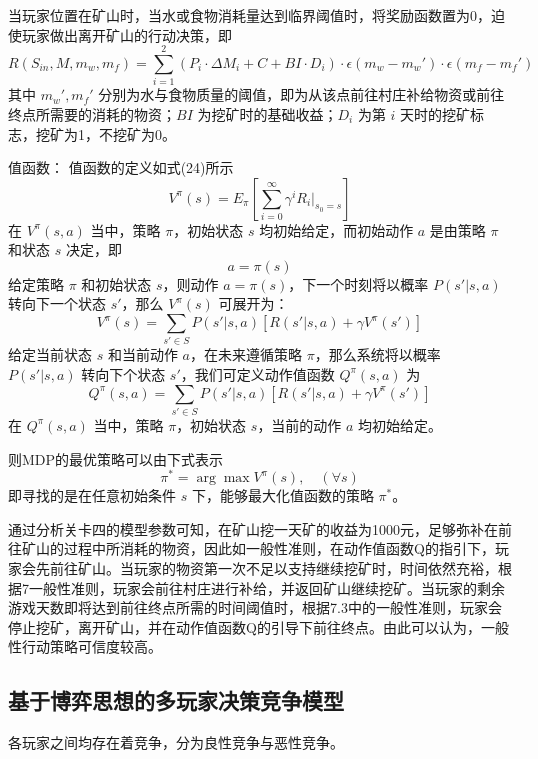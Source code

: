 \documentclass[UTF8]{article}
\begin{document}
当玩家位置在矿山时，当水或食物消耗量达到临界阈值时，将奖励函数置为0，迫使玩家做出离开矿山的行动决策，即
\[
R(S_{in}, M, m_w, m_f) = \sum_{i=1}^{2}(P_i \cdot \Delta M_i + C + BI \cdot D_i) \cdot \epsilon(m_w - m_w') \cdot \epsilon(m_f - m_f') 
\]
其中 \(m_w', m_f'\) 分别为水与食物质量的阈值，即为从该点前往村庄补给物资或前往终点所需要的消耗的物资；\(BI\) 为挖矿时的基础收益；\(D_i\) 为第 \(i\) 天时的挖矿标志，挖矿为1，不挖矿为0。

值函数：
值函数的定义如式(24)所示
\[
V^\pi(s) = E_\pi\left[\sum_{i=0}^{\infty} \gamma^i R_i \big|_{s_0 = s}\right] 
\]
在 \(V^\pi(s,a)\) 当中，策略 \(\pi\)，初始状态 \(s\) 均初始给定，而初始动作 \(a\) 是由策略 \(\pi\) 和状态 \(s\) 决定，即
\[
a = \pi(s) 
\]
给定策略 \(\pi\) 和初始状态 \(s\)，则动作 \(a = \pi(s)\)，下一个时刻将以概率 \(P(s'|s,a)\) 转向下一个状态 \(s'\)，那么 \(V^\pi(s)\) 可展开为：
\[
V^\pi(s) = \sum_{s' \in S} P(s'|s,a)[R(s'|s,a) + \gamma V^\pi(s')] 
\]
给定当前状态 \(s\) 和当前动作 \(a\)，在未来遵循策略 \(\pi\)，那么系统将以概率 \(P(s'|s,a)\) 转向下个状态 \(s'\)，我们可定义动作值函数 \(Q^\pi(s,a)\) 为
\[
Q^\pi(s,a) = \sum_{s' \in S} P(s'|s,a)[R(s'|s,a) + \gamma V^\pi(s')] 
\]
在 \(Q^\pi(s,a)\) 当中，策略 \(\pi\)，初始状态 \(s\)，当前的动作 \(a\) 均初始给定。

则MDP的最优策略可以由下式表示
\[
\pi^* = \arg \max V^\pi(s), \quad (\forall s) 
\]
即寻找的是在任意初始条件 \(s\) 下，能够最大化值函数的策略 \(\pi^*\)。

通过分析关卡四的模型参数可知，在矿山挖一天矿的收益为1000元，足够弥补在前往矿山的过程中所消耗的物资，因此如一般性准则，在动作值函数Q的指引下，玩家会先前往矿山。当玩家的物资第一次不足以支持继续挖矿时，时间依然充裕，根据7一般性准则，玩家会前往村庄进行补给，并返回矿山继续挖矿。当玩家的剩余游戏天数即将达到前往终点所需的时间阈值时，根据7.3中的一般性准则，玩家会停止挖矿，离开矿山，并在动作值函数Q的引导下前往终点。由此可以认为，一般性行动策略可信度较高。

\subsection*{基于博弈思想的多玩家决策竞争模型}
各玩家之间均存在着竞争，分为良性竞争与恶性竞争。
\end{document}
